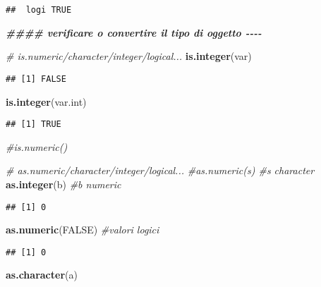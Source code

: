 \documentclass[
]{article}
\newenvironment{Shaded}{\begin{snugshade}}{\end{snugshade}}
\newcommand{\CommentTok}[1]{\textcolor[rgb]{0.56,0.35,0.01}{\textit{#1}}}
\newcommand{\ConstantTok}[1]{\textcolor[rgb]{0.56,0.35,0.01}{#1}}
\newcommand{\DocumentationTok}[1]{\textcolor[rgb]{0.56,0.35,0.01}{\textbf{\textit{#1}}}}
\newcommand{\FunctionTok}[1]{\textcolor[rgb]{0.13,0.29,0.53}{\textbf{#1}}}
\newcommand{\NormalTok}[1]{#1}
\begin{document}
\begin{verbatim}
##  logi TRUE
\end{verbatim}

\begin{Shaded}
\begin{Highlighting}[]
\DocumentationTok{\#\#\#\# verificare o convertire il tipo di oggetto {-}{-}{-}{-}}

\CommentTok{\# is.numeric/character/integer/logical...}
\FunctionTok{is.integer}\NormalTok{(var)}
\end{Highlighting}
\end{Shaded}

\begin{verbatim}
## [1] FALSE
\end{verbatim}

\begin{Shaded}
\begin{Highlighting}[]
\FunctionTok{is.integer}\NormalTok{(var.int)}
\end{Highlighting}
\end{Shaded}

\begin{verbatim}
## [1] TRUE
\end{verbatim}

\begin{Shaded}
\begin{Highlighting}[]
\CommentTok{\#is.numeric()}

\CommentTok{\# as.numeric/character/integer/logical...}
\CommentTok{\#as.numeric(s) \#s character}
\FunctionTok{as.integer}\NormalTok{(b) }\CommentTok{\#b numeric}
\end{Highlighting}
\end{Shaded}

\begin{verbatim}
## [1] 0
\end{verbatim}

\begin{Shaded}
\begin{Highlighting}[]
\FunctionTok{as.numeric}\NormalTok{(}\ConstantTok{FALSE}\NormalTok{) }\CommentTok{\#valori logici}
\end{Highlighting}
\end{Shaded}

\begin{verbatim}
## [1] 0
\end{verbatim}

\begin{Shaded}
\begin{Highlighting}[]
\FunctionTok{as.character}\NormalTok{(a)}
\end{Highlighting}
\end{Shaded}
\end{document}
